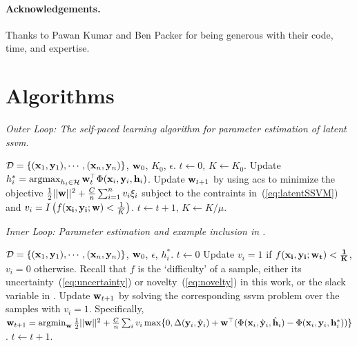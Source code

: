 \documentclass{article}
\newcommand{\mysection}[1]{\vspace{-4mm}\section{#1}\vspace{-4mm}}
\newcommand{\myparagraph}[1]{\vspace{-2mm}\paragraph{#1}}
\newcommand{\mytopcaption}[1]{\caption{\em \footnotesize #1}}
\newcommand{\argmin}{\operatornamewithlimits{argmin}}
\newcommand{\argmax}{\operatornamewithlimits{argmax}}
\begin{document}
\myparagraph{Acknowledgements.}
Thanks to Pawan Kumar and Ben Packer for being generous with their code, time, and expertise.

\appendix

\newpage

\mysection{Algorithms}
\label{sec:algs}

\begin{algorithm}[h!]
\mytopcaption{Outer Loop: The self-paced learning algorithm for parameter estimation of latent {\sc ssvm}.}
\label{algo:selfPacedLatentSSVM}
\begin{algorithmic}[1]
\INPUT ${\cal D} = \{({\bf x}_1,{\bf y}_1),\cdots,({\bf x}_n,{\bf y}_n)\}$, ${\bf w}_0$, $K_0$, $\epsilon$.
\STATE $t \leftarrow 0$, $K \leftarrow K_0$.
\REPEAT
\STATE Update $h_i^* = \argmax_{h_i \in {\cal H}} {\bf w}_{t}^\top \Phi({\bf x}_i,{\bf y}_i,{\bf h}_i)$.
\STATE Update ${\bf w}_{t+1}$ by using {\sc acs} to minimize the objective
$\frac{1}{2}||{\bf w}||^2 + \frac{C}{n} \sum_{i=1}^n v_i\xi_i$ subject to the contraints in~(\ref{eq:latentSSVM}) and $v_i=I\left(f({\bf x_i,\bf y_i;\bf w}) < \frac{1}{K}\right)$.
\STATE $t \leftarrow t + 1$, $K \leftarrow K/\mu$.
\end{algorithmic}
\end{algorithm}


\begin{algorithm}[h!]
\mytopcaption{Inner Loop: Parameter estimation and example inclusion in \sc{SPL}.}
\label{algo:latentSSVM}
\begin{algorithmic}[1]
\INPUT ${\cal D} = \{({\bf x}_1,{\bf y}_1),\cdots,({\bf x}_n,{\bf y}_n)\}$, ${\bf w}_0$, $\epsilon$, $h_i^*$.
\STATE $t \leftarrow 0$
\REPEAT
\STATE Update $v_i = 1$ if $f(\bf x_i, \bf y_i;\bf w_t) < \frac{1}{K}$, $v_i=0$ otherwise.  Recall that $f$ is the `difficulty' of a sample, either its uncertainty~(\ref{eq:uncertainty}) or novelty~(\ref{eq:novelty}) in this work, or the slack variable in \cite{SPL}.
\STATE Update ${\bf w}_{t+1}$ by solving the corresponding
{\sc ssvm} problem over the samples with $v_i=1$. Specifically, \\
${\bf w}_{t+1} = \argmin_{\bf w} \frac{1}{2}||{\bf w}||^2 + \frac{C}{n}\sum_{i} v_i\max\{0,\Delta({\bf y}_i,\hat{\bf y}_i) +
		{\bf w}^\top (\Phi({\bf x}_i,\hat{\bf y}_i,\hat{\bf h}_i) - \Phi({\bf x}_i,{\bf y}_i,{\bf h}_i^*))\}$.
\STATE $t \leftarrow t + 1$.
\end{algorithmic}
\end{algorithm}
\end{document}
